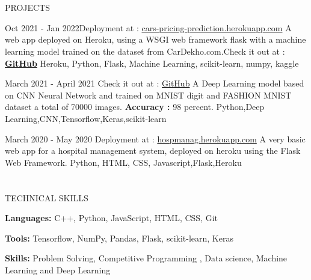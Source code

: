 \documentclass{my_cv}
\begin{document}
\begin{multicols}{2}
\section{\faPencil}{PROJECTS}
    
%
    {Oct 2021 - Jan 2022\newline Deployment at : {\href{https://cars-pricing-prediction.herokuapp.com/}{cars-pricing-prediction.herokuapp.com}}}
    {A web app deployed on Heroku, using a WSGI web framework flask with a machine learning model trained on the dataset from CarDekho.com.\newline Check it out at : {\textbf{\href{https://github.com/AnkitDevri/carPricePrediction}{GitHub}}} 
    }
    {Heroku, Python, Flask, Machine Learning, scikit-learn, numpy, kaggle}
    \par
%
    {March 2021 - April 2021 \newline Check it out at : {\href{https://github.com/AnkitDevri/Denosing-Autoencoder}{GitHub}} 
    }%
    {A Deep Learning model based on CNN Neural Network and trained on MNIST digit and FASHION MNIST dataset a total of 70000 images. \textbf{Accuracy :} 98 percent. }%
    {Python,Deep Learning,CNN,Tensorflow,Keras,scikit-learn}
    \par
{}%
    {March 2020 - May 2020 \newline Deployment at : {\href{https://hospmanag.herokuapp.com/}{hospmanag.herokuapp.com}}}%
    {A very basic web app for a hospital management system, deployed on heroku using the Flask Web Framework. }%
    {Python, HTML, CSS, Javascript,Flask,Heroku}
     

    
    
\section{\faList}{TECHNICAL SKILLS}

\textbf{Languages:} C++, Python, JavaScript, HTML, CSS, Git

\noindent\textbf{Tools:} Tensorflow, NumPy, Pandas, Flask, scikit-learn, Keras

\noindent\textbf{Skills:} Problem Solving, Competitive Programming , Data science, Machine Learning and Deep Learning

\columnbreak


\end{multicols}
\end{document}
